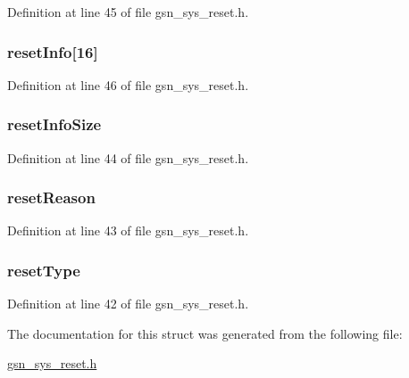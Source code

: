 Definition at line 45 of file gsn\_\-sys\_\-reset.h.

\hypertarget{a00256_ab5521c89f8f524c9a3e9fa8e6591b9f8}{
\subsubsection[{resetInfo}]{ {\bf resetInfo}\mbox{[}16\mbox{]}}}
\label{a00256_ab5521c89f8f524c9a3e9fa8e6591b9f8}


Definition at line 46 of file gsn\_\-sys\_\-reset.h.

\hypertarget{a00256_af784980100bfb4e57308fee9850b394b}{
\subsubsection[{resetInfoSize}]{ {\bf resetInfoSize}}}
\label{a00256_af784980100bfb4e57308fee9850b394b}


Definition at line 44 of file gsn\_\-sys\_\-reset.h.

\hypertarget{a00256_a860e10ca47301c26f0cc214d9aaa74b9}{
\subsubsection[{resetReason}]{ {\bf resetReason}}}
\label{a00256_a860e10ca47301c26f0cc214d9aaa74b9}


Definition at line 43 of file gsn\_\-sys\_\-reset.h.

\hypertarget{a00256_a424379d8fb70c92b5ebe7450172ed356}{
\subsubsection[{resetType}]{ {\bf resetType}}}
\label{a00256_a424379d8fb70c92b5ebe7450172ed356}


Definition at line 42 of file gsn\_\-sys\_\-reset.h.



The documentation for this struct was generated from the following file:\begin{DoxyCompactItemize}
\item 
\hyperlink{a00594}{gsn\_\-sys\_\-reset.h}\end{DoxyCompactItemize}
